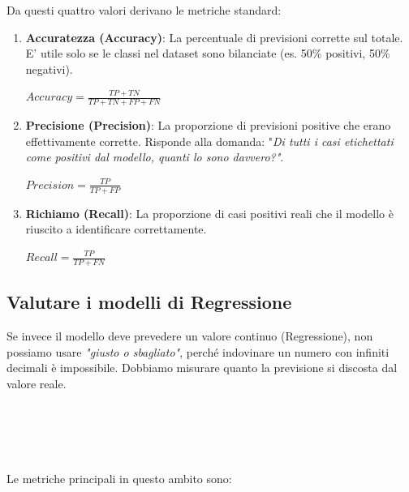 \documentclass{article}
\begin{document}
Da questi quattro valori derivano le metriche standard:\\
\begin{enumerate}
    \item \textbf{Accuratezza (Accuracy)}: La percentuale di previsioni corrette sul totale. E' utile solo se le classi nel dataset sono bilanciate (es. 50\% positivi, 50\% negativi). \\

    \centerline{$Accuracy = \frac{TP +TN}{TP+TN+FP+FN}$}
    
\item \textbf{Precisione (Precision)}: La proporzione di previsioni positive che erano effettivamente corrette. Risponde alla domanda: "\textit{Di tutti i casi etichettati come positivi dal modello, quanti lo sono davvero?"}.\\

\centerline{$Precision = \frac{TP}{TP+FP}$}

\item \textbf{Richiamo (Recall)}: La proporzione di casi positivi reali che il modello è riuscito a identificare correttamente.
\\
\centerline{$Recall = \frac{TP}{TP+FN}$}

\end{enumerate}

\subsection{Valutare i modelli di Regressione}
Se invece il modello deve prevedere un valore continuo (Regressione), non possiamo usare \textit{"giusto o sbagliato"}, perché indovinare un numero con infiniti decimali è impossibile. Dobbiamo misurare quanto la previsione si discosta dal valore reale.\\
\\
\\
\\
\\
\\
Le metriche principali in questo ambito sono: \\
\end{document}
